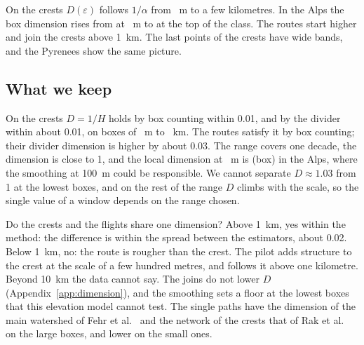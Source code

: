On the crests $D(\varepsilon)$ follows $1/\alpha$ from \DmEpsMin~m to a few kilometres. In the Alps the box dimension rises from \DmLocAlpsCrBoxLo{} at \DmEpsMin~m to \DmLocAlpsCrBoxHi{} at the top of the class.
The routes start higher and join the crests above 1~km. The last points of the crests have wide bands, and the Pyrenees show the same picture.

\subsection{What we keep}

On the crests $D=1/H$ holds by box counting within 0.01, and by the divider within about 0.01, on boxes of \DmEpsMin~m to \DmCrAlpsFromEpsHiKm~km. The routes satisfy it by box counting; their divider dimension is
higher by about 0.03. The range covers one decade, the dimension is close to 1, and the local dimension at \DmEpsMin~m is \DmLocAlpsCrBoxLo{} (box) in the Alps, where the smoothing at 100~m could be responsible.
We cannot separate $D\approx1.03$ from 1 at the lowest boxes, and on the rest of the range $D$ climbs with the scale, so the single value of a window depends on the range chosen.

Do the crests and the flights share one dimension? Above 1~km, yes within the method: the difference is within the spread between the estimators, about 0.02. Below 1~km, no: the route is rougher than the crest.
The pilot adds structure to the crest at the scale of a few hundred metres, and follows it above one kilometre. Beyond 10~km the data cannot say.
The joins do not lower $D$ (Appendix~\ref{app:dimension}), and the smoothing sets a floor at the lowest boxes that this elevation model cannot test. The single paths have the dimension of the main watershed of Fehr et al.~\cite{fehr}
and the network of the crests that of Rak et al.~\cite{rak} on the large boxes, and lower on the small ones.
